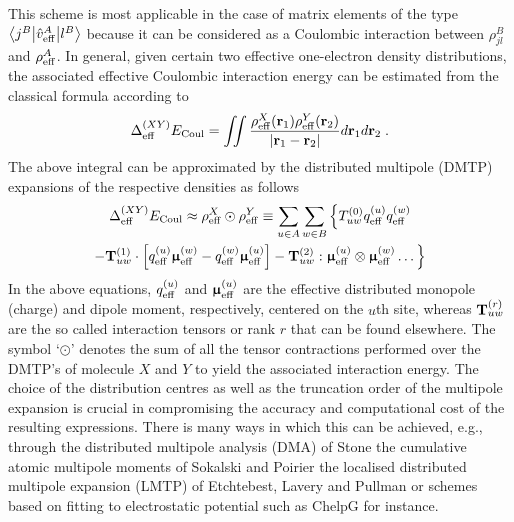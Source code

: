 This scheme is most applicable in the case of matrix elements of the type
$
 \bigl\langle {j^B} \bigl\lvert {\hat{v}_{\rm eff}^A} \bigl\lvert {l^B} \bigr\rangle
$
because it can be considered as a Coulombic interaction between $\rho^B_{jl}$
and $\rho^A_{\rm eff}$. 
In general, given certain two effective one\hyp{}electron density distributions,
the associated effective Coulombic interaction energy can be estimated from the classical formula
according to
%
\begin{equation} \label{e:coulomb-energy:general}
 \Delta^{(XY)}_{\rm eff} E_{\rm Coul} = \iint \frac{\rho_{\rm eff}^X({\bf r}_1) \rho_{\rm eff}^Y({\bf r}_2)}
 {\vert {\bf r}_1 - {\bf r}_2 \vert} 
d{\bf r}_1 d{\bf r}_2 \;.
\end{equation}
%
The above integral can be approximated by the
distributed multipole (DMTP)
expansions of the respective densities as follows
%
\begin{multline} \label{e:coulomb-energy:dmtp}
  \Delta^{(XY)}_{\rm eff} E_{\rm Coul} \approx
 \rho_{\rm eff}^X \odot \rho_{\rm eff}^Y \equiv
 \sum_{u\in A} \sum_{w\in B} \Big\{ 
 T^{(0)}_{uw}
 q_{\rm eff}^{(u)}  q_{\rm eff}^{(w)} \\
 - {\bf T}^{(1)}_{uw} \cdot 
   \left[ q_{\rm eff}^{(u)} {\bm{\upmu}}_{\rm eff}^{(w)} - q_{\rm eff}^{(w)} {\bm{\upmu}}_{\rm eff}^{(u)} \right]
 - {\bf T}^{(2)}_{uw} : 
  {\bm{\upmu}}_{\rm eff}^{(u)}  \otimes {\bm{\upmu}}_{\rm eff}^{(w)} 
 \ldots
 \Big\}
\end{multline}
%
In the above equations, $q_{\rm eff}^{(u)}$ and ${\bm{\upmu}}^{(u)}_{\rm eff}$ 
are the effective distributed monopole (charge)
and dipole moment, respectively, centered on the $u$th site, 
whereas ${{\bf T}^{(r)}_{uw}}$ are the so called interaction tensors or rank $r$ 
that can be found elsewhere.
The symbol `$\odot$' denotes the sum of all the tensor contractions
performed over the DMTP's of molecule $X$ and $Y$ to yield the associated interaction energy.
The choice of the distribution centres as well as the truncation order of the multipole expansion
is crucial in compromising the accuracy and computational cost of the resulting expressions.
There is many ways in which this can be achieved, e.g., through the distributed multipole analysis (DMA)
of Stone\cite{Stone.JCTC.2005}
the cumulative atomic multipole moments of Sokalski and Poirier\cite{Sokalski.Poirier.CPL.1983}
the localised distributed multipole expansion (LMTP) of Etchtebest, Lavery and Pullman\cite{Etchebest.Lavery.Pullman.TheorChimActa.1982}
or schemes based on fitting to electrostatic potential such as ChelpG\cite{Breneman.Wiberg.JCC.1990} for instance.

